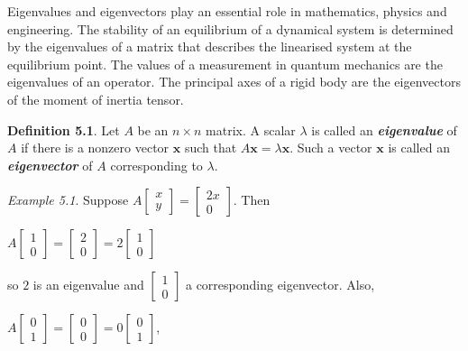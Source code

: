 \documentclass[
  letterpaper,
  DIV=11,
  numbers=noendperiod]{scrartcl}
\theoremstyle{remark}
\begin{document}
Eigenvalues and eigenvectors play an essential role in mathematics,
physics and engineering. The stability of an equilibrium of a dynamical
system is determined by the eigenvalues of a matrix that describes the
linearised system at the equilibrium point. The values of a measurement
in quantum mechanics are the eigenvalues of an operator. The principal
axes of a rigid body are the eigenvectors of the moment of inertia
tensor.

\textbf{Definition 5.1}. Let \(A\) be an \(n \times n\) matrix. A scalar
\(\lambda\) is called an \textbf{\emph{eigenvalue}} of \(A\) if there is
a nonzero vector \(\mathbf{x}\) such that
\(A\mathbf{x} = \lambda \mathbf{x}\). Such a vector \(\mathbf{x}\) is
called an \textbf{\emph{eigenvector}} of \(A\) corresponding to
\(\lambda\).

\emph{Example 5.1}. Suppose
\(A\left[\begin{array}{c} x \\ y \end{array}\right] = \left[\begin{array}{c} 2x \\ 0 \end{array}\right]\).
Then

\(A\left[\begin{array}{c} 1 \\ 0 \end{array}\right] = \left[\begin{array}{c} 2 \\ 0 \end{array}\right] = 2\left[\begin{array}{c} 1 \\ 0 \end{array}\right]\)

so \(2\) is an eigenvalue and
\(\left[\begin{array}{c} 1 \\ 0 \end{array}\right]\) a corresponding
eigenvector. Also,

\(A\left[\begin{array}{c} 0 \\ 1 \end{array}\right] = \left[\begin{array}{c} 0 \\ 0 \end{array}\right] = 0\left[\begin{array}{c} 0 \\ 1 \end{array}\right]\),
\end{document}
